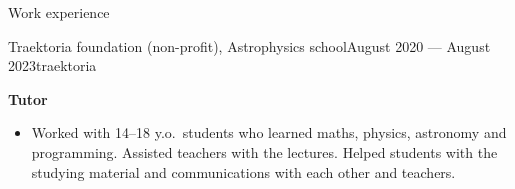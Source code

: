 \documentclass{resume} %
\newcommand{\subheader}[2]{
	{\textbf{#1}} \ifthenelse{\equal{#2}{}}{}{\timestamp{#2}}
}
\begin{document}
\begin{rSection}{Work experience}
		\vspace{1em}

		\begin{rSubsection}{Traektoria foundation (non-profit), Astrophysics school}{August 2020 --- August 2023}{}{}{traektoria}
			\item \subheader{Tutor}{}
			\begin{itemize}
				\item Worked with 14--18 y.o.\ students who learned maths, physics, astronomy and programming. Assisted teachers with the lectures. Helped students with the studying material and communications with each other and teachers.
			\end{itemize}
		\end{rSubsection}
    \end{rSection}
\end{document}
